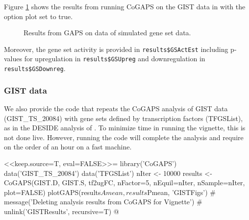 \documentclass{report}
\begin{document}
Figure \ref{fig:GS} shows the results from running CoGAPS on the GIST data in \cite{Ochs2009} with the option plot set to true.
\begin{figure}[ht]
\begin{center}
\end{center}
\caption{Results from GAPS on data of simulated gene set data.}
\label{fig:GS}
\end{figure}

\par Moreover, the gene set activity is provided in \texttt{results\$GSActEst} including p-values for upregulation in \texttt{results\$GSUpreg} and downregulation in \texttt{results\$GSDownreg}.

\subsubsection{GIST data}

\par We also provide the code that repeats the CoGAPS analysis of GIST data (GIST\_TS\_20084) with gene sets defined by transcription factors (TFGSList), as in the DESIDE analysis of \cite{Ochs2009}.  To minimize time in running the vignette, this is not done live.  However, running the code will complete the analysis and require on the order of an hour on a fast machine.

<<keep.source=T, eval=FALSE>>=
library('CoGAPS')
data('GIST_TS_20084')
data('TFGSList')
nIter <- 10000 
results <- CoGAPS(GIST.D, GIST.S, tf2ugFC,
                  nFactor=5,
                  nEquil=nIter, nSample=nIter,
                  plot=FALSE)
plotGAPS(results$Amean, results$Pmean, 'GISTFigs')
# message('Deleting analysis results from CoGAPS for Vignette')
# unlink('GISTResults', recursive=T)
@  
\end{document}
